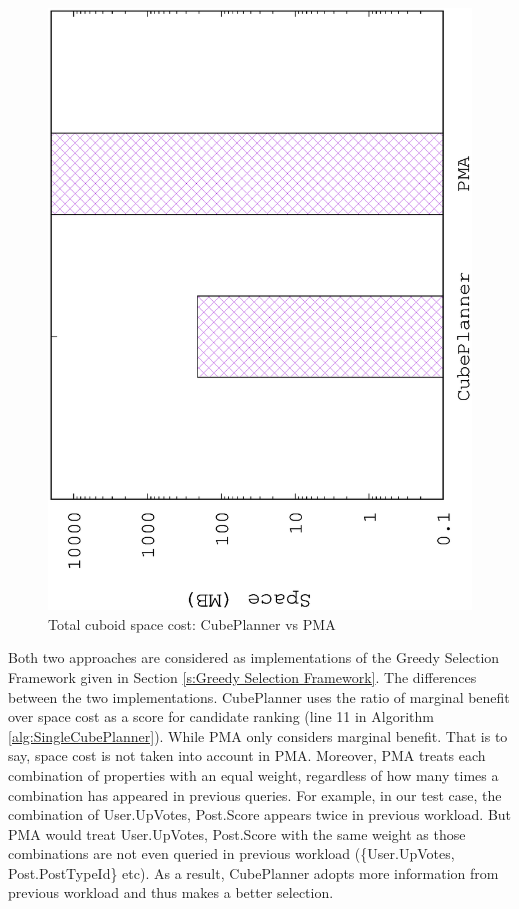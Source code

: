 \begin{figure}[H]
	\centering
	\includegraphics[scale=0.47, angle=270]{plot/jiaweispace.eps}
	\caption{Total cuboid space cost: CubePlanner vs PMA}
	\label{fig:jiaweispace}
\end{figure}

Both two approaches are considered as implementations of the Greedy Selection Framework given in Section \ref{s:Greedy Selection Framework}. The differences between the two implementations. CubePlanner uses the ratio of marginal benefit over space cost as a score for candidate ranking (line 11 in Algorithm \ref{alg:SingleCubePlanner}). While PMA only considers marginal benefit. That is to say, space cost is not taken into account in PMA. Moreover, PMA treats each combination of properties with an equal weight, regardless of how many times a combination has appeared in previous queries. For example, in our test case, the combination of {User.UpVotes, Post.Score} appears twice in previous workload. But PMA would treat {User.UpVotes, Post.Score} with the same weight as those combinations are not even queried in previous workload (\{User.UpVotes, Post.PostTypeId\} etc). As a result, CubePlanner adopts more information from previous workload and thus makes a better selection.

